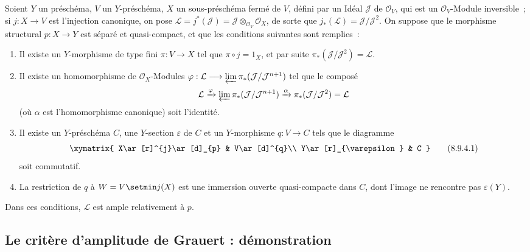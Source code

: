 \begin{proposition}[8.9.4]
\label{II.8.9.4-fr}
Soient $Y$ un préschéma, $V$ un $Y$-préschéma, $X$ un sous-préschéma fermé de
$V$, défini par un Idéal $\mathcal{J}$ de $\mathcal{O}_V$, qui est un
$\mathcal{O}_V$-Module \textup{inversible}~; si $j:X\to V$ est
l'injection canonique, on pose
$\mathcal{L}=j^*(\mathcal{J})=
\mathcal{J}\otimes_{\mathcal{O}_V}\mathcal{O}_X$, de sorte que
$j_*(\mathcal{L})=\mathcal{J}/\mathcal{J}^2$. On suppose que le morphisme
structural $p:X\to Y$ est séparé et quasi-compact, et que les conditions
suivantes sont remplies~:
\begin{enumerate}
  \item[\rm{(i)}] Il existe un $Y$-morphisme de type fini $\pi:V\to X$ tel
  que $\pi\circ j=1_X$, et par suite
  $\pi_*(\mathcal{J}/\mathcal{J}^2)=\mathcal{L}$.
  \item[\rm{(ii)}] Il existe un homomorphisme de $\mathcal{O}_X$-Modules
  $\varphi:\mathcal{L}\longrightarrow\varprojlim\pi_*(\mathcal{J}/\mathcal{J}^{n+1})$
  tel que le composé
  \[
    \mathcal{L}\xrightarrow{\varphi}
    \varprojlim\pi_*(\mathcal{J}/\mathcal{J}^{n+1})
    \xrightarrow{\alpha}\pi_*(\mathcal{J}/\mathcal{J}^2)=\mathcal{L}
  \]
  (où $\alpha$ est l'homomorphisme canonique) soit l'identité.
  \item[\rm{(iii)}] Il existe un $Y$-préschéma $C$, une $Y$-section
  $\varepsilon$ de $C$ et un $Y$-morphisme $q:V\to C$ tels que le diagramme
  \begin{equation}
  \label{II.8.9.4.1-fr}
    \xymatrix{
      X\ar[r]^{j}\ar[d]_{p} & V\ar[d]^{q}\\
      Y\ar[r]_{\varepsilon} & C
    }
  \tag{8.9.4.1}
  \end{equation}
  soit commutatif.
  \item[\rm{(iv)}] La restriction de $q$ à $W=V\setmin j(X)$ est une immersion
  ouverte quasi-compacte dans $C$, dont l'image ne rencontre pas
  $\varepsilon(Y)$.
\end{enumerate}

Dans ces conditions, $\mathcal{L}$ est ample relativement à $p$.
\end{proposition}

\subsection{Le critère d'amplitude de Grauert : démonstration}
\label{subsection:II.8.10-fr}

